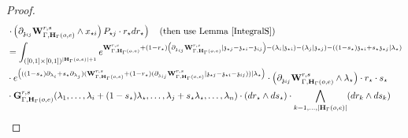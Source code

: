 \documentclass[11pt]{amsart}
\theoremstyle{definition}
\theoremstyle{remark}
\numberwithin{equation}{section}
\begin{document}
\begin{proof}
\begin{align*}
      &    \left.\cdot \left(\partial_{\mathfrak{z}_{ij}}\mathbf{W}^{r,s}_{\Gamma,\mathbf{H}_{\Gamma}(o,e)}\wedge x_{\star i}\right) P_{\star j}\cdot r_{\star}dr_{\star}\right)\quad (\text{then use Lemma \ref{IntegralS}})\\
                     &= \int_{([0,1]\times[0,1])^{|\mathbf{H}_{\Gamma}(o,e)|+1}} e^{\mathbf{W}^{r,s}_{\Gamma,\mathbf{H}_{\Gamma}(o,e)}+(1-r_{\star})\left(\partial_{\mathfrak{z}_{ij}}\mathbf{W}^{r,s}_{\Gamma,\mathbf{H}_{\Gamma}(o,e)}|\mathfrak{z}_{\star j}-\mathfrak{z}_{\star i}-\mathfrak{z}_{ij}\right)-\left(\lambda_i|\mathfrak{z}_{\star i}\right)-\left(\lambda_j|\mathfrak{z}_{\star j}\right)-\left((1-s_{\star})\mathfrak{z}_{\star i}+s_{\star}\mathfrak{z}_{\star j}|\lambda_{\star}\right)} \\
   & \cdot e^{\left(((1-s_{\star})\partial_{\lambda_i}+s_{\star}\partial_{\lambda_j})(\mathbf{W}^{r,s}_{\Gamma,\mathbf{H}_{\Gamma}(o,e)}+(1-r_{\star})(\partial_{\mathfrak{z}_{ij}}\mathbf{W}^{r,s}_{\Gamma,\mathbf{H}_{\Gamma}(o,e)}|\mathfrak{z}_{\star j}-\mathfrak{z}_{\star i}-\mathfrak{z}_{ij}))|\lambda_{\star}\right)}\cdot \left(\partial_{\mathfrak{z}_{ij}}\mathbf{W}^{r,s}_{\Gamma,\mathbf{H}_{\Gamma}(o,e)}\wedge\lambda_{\star}\right)\cdot r_{\star}\cdot s_{\star}\\
   &\cdot  \mathbf{G}^{r,s}_{\Gamma,\mathbf{H}_{\Gamma}(o,e)}(\lambda_1,\dots,\lambda_i+(1-s_{\star})\lambda_{\star},\dots,\lambda_j+s_{\star}\lambda_{\star},\dots,\lambda_{n})\cdot (dr_{\star}\wedge ds_{\star})\cdot \bigwedge_{k=1,\dots,|\mathbf{H}_{\Gamma}(o,e)|} (dr_k\wedge ds_k)
\end{align*}




\end{proof}
\end{document}

